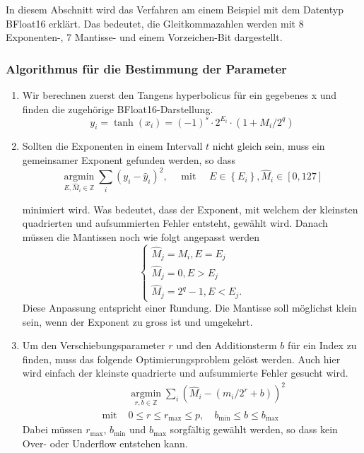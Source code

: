 In diesem Abschnitt wird das Verfahren am einem Beispiel mit dem Datentyp BFloat16 erklärt. Das bedeutet, die Gleitkommazahlen werden mit 8 Exponenten-, 7 Mantisse- und einem Vorzeichen-Bit dargestellt.

\subsubsection{Algorithmus für die Bestimmung der Parameter
	\label{transfer:subsection:Ktanh-Algorithmus:Algo}}

\begin{enumerate}
    \item Wir berechnen zuerst den Tangens hyperbolicus für ein gegebenes x und finden die zugehörige BFloat16-Darstellung.
    \[
    y_{i}=\operatorname{tanh}\left(x_{i}\right)=(-1)^{s} \cdot 2^{E_{i}} \cdot\left(1+M_{i} / 2^{q}\right)
    \]
     
    \item Sollten die Exponenten in einem Intervall $t$ nicht gleich sein, muss ein gemeinsamer Exponent gefunden werden, so dass 
    \begin{equation} \label{minforexp}
    \underset{E, \hat{M}_{i} \in \mathbb{Z}}{\operatorname{argmin}} \sum_{i}\left(y_{i}-\hat{y}_{i}\right)^{2}, \quad \text { mit } \quad E \in\left\{E_{i}\right\}, \hat{M}_{i} \in[0,127]
	\end{equation}

    minimiert wird. Was bedeutet, dass der Exponent, mit welchem der kleinsten quadrierten und aufsummierten Fehler entsteht, gewählt wird. Danach müssen die Mantissen noch wie folgt angepasst werden
    $$
    \left\{\begin{array}{l}
    	\hat{M}_{j}=M_{i}, E=E_{j} \\
    	\hat{M}_{j}=0, E>E_{j} \\
    	\hat{M}_{j}=2^{q}-1, E<E_{j}.
    \end{array}\right.
    $$
	Diese Anpassung entspricht einer Rundung. Die Mantisse soll möglichst klein sein, wenn der Exponent zu gross ist und umgekehrt.
    \item Um den Verschiebungsparameter $r$ und den Additionsterm $b$ für ein Index zu finden, muss das folgende Optimierungsproblem gelöst werden. Auch hier wird einfach der kleinste quadrierte und aufsummierte Fehler gesucht wird.
    $$
    \begin{array}{ll} 
    	& \underset{r, b \in \mathbb{Z}}{\operatorname{argmin}} \sum_{i}\left(\hat{M}_{i}-\left(m_{i} / 2^{r}+b\right)\right)^{2} \\
    	\text { mit } & 0 \leq r \leq r_{\max } \leq p, \quad b_{\min } \leq b \leq b_{\max }
    \end{array}
    $$
    Dabei müssen $r_{\max}$, $b_{\min}$ und $b_{\max}$ sorgfältig gewählt werden, so dass kein Over- oder Underflow entstehen kann.
\end{enumerate}

